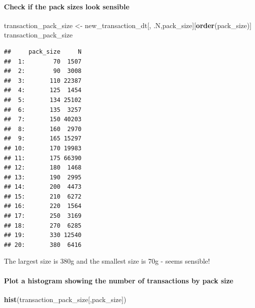 \documentclass[
]{article}
\newenvironment{Shaded}{\begin{snugshade}}{\end{snugshade}}
\newcommand{\FunctionTok}[1]{\textcolor[rgb]{0.13,0.29,0.53}{\textbf{#1}}}
\newcommand{\NormalTok}[1]{#1}
\newcommand{\OtherTok}[1]{\textcolor[rgb]{0.56,0.35,0.01}{#1}}
\begin{document}
\hypertarget{check-if-the-pack-sizes-look-sensible}{%
\paragraph{Check if the pack sizes look
sensible}\label{check-if-the-pack-sizes-look-sensible}}

\begin{Shaded}
\begin{Highlighting}[]
\NormalTok{transaction\_pack\_size }\OtherTok{\textless{}{-}}\NormalTok{ new\_transaction\_dt[, .N,pack\_size][}\FunctionTok{order}\NormalTok{(pack\_size)]}
\NormalTok{transaction\_pack\_size}
\end{Highlighting}
\end{Shaded}

\begin{verbatim}
##     pack_size     N
##  1:        70  1507
##  2:        90  3008
##  3:       110 22387
##  4:       125  1454
##  5:       134 25102
##  6:       135  3257
##  7:       150 40203
##  8:       160  2970
##  9:       165 15297
## 10:       170 19983
## 11:       175 66390
## 12:       180  1468
## 13:       190  2995
## 14:       200  4473
## 15:       210  6272
## 16:       220  1564
## 17:       250  3169
## 18:       270  6285
## 19:       330 12540
## 20:       380  6416
\end{verbatim}

The largest size is 380g and the smallest size is 70g - seems sensible!

\hypertarget{plot-a-histogram-showing-the-number-of-transactions-by-pack-size}{%
\paragraph{Plot a histogram showing the number of transactions by pack
size}\label{plot-a-histogram-showing-the-number-of-transactions-by-pack-size}}

\begin{Shaded}
\begin{Highlighting}[]
\FunctionTok{hist}\NormalTok{(transaction\_pack\_size[,pack\_size])}
\end{Highlighting}
\end{Shaded}
\end{document}

